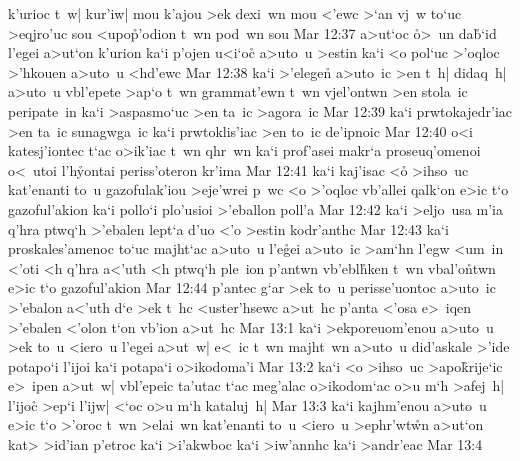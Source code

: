 k'urioc
t~w|
kur'iw|
mou
k'ajou
>ek
dexi~wn
mou
<'ewc
>`an
vj~w
to`uc
>eqjro'uc
sou
<upo\r{p}'odion
t~wn
pod~wn
sou\bibvsend
\vs Mar 12:37
a>ut`oc
\r{o}>~un
da\r{b}`id
l'egei
a>ut`on
k'urion
ka`i
p'ojen
u<i`oc\r{}
a>uto~u
>estin
ka`i
<o
pol`uc
>'oqloc
>'hkouen
a>uto~u
<hd'ewc\bibvsend
\vs Mar 12:38
ka`i
>'elegen\r{}
a>uto~ic
>en
t~h|
didaq~h|
a>uto~u
vbl'epete
>ap`o
t~wn
grammat'ewn
t~wn
vjel'ontwn
>en
stola~ic
peripate~in
ka`i
>aspasmo`uc
>en
ta~ic
>agora~ic\bibvsend
\vs Mar 12:39
ka`i
prwtokajedr'iac
>en
ta~ic
sunagwga~ic
ka`i
prwtoklis'iac
>en
to~ic
de'ipnoic\bibvsend
\vs Mar 12:40
o<i
katesj'iontec
t`ac
o>ik'iac
t~wn
qhr~wn
ka`i
prof'asei
makr`a
proseuq'omenoi
o<~utoi
l'h\r{y}ontai
periss'oteron
kr'ima\bibvsend
\vs Mar 12:41
ka`i
kaj'isac
<o\r{}
>ihso~uc
kat'enanti
to~u
gazofulak'iou
>eje'wrei
p~wc
<o
>'oqloc
vb'allei
qalk`on
e>ic
t`o
gazoful'akion
ka`i
pollo`i
plo'usioi
>'eballon
poll'a\bibvsend
\vs Mar 12:42
ka`i
>eljo~usa
m'ia
q'hra
ptwq`h
>'ebalen
lept`a
d'uo
<'o
>estin
kodr'anthc\bibvsend
\vs Mar 12:43
ka`i
proskales'amenoc
to`uc
majht`ac
a>uto~u
l'e\r{g}ei
a>uto~ic
>am`hn
l'egw
<um~in
<'oti
<h
q'hra
a<'uth
<h
ptwq`h
ple~ion
p'antwn
vb'ebl\r{h}ken
t~wn
vbal'o\r{n}twn
e>ic
t`o
gazoful'akion\bibvsend
\vs Mar 12:44
p'antec
g`ar
>ek
to~u
perisse'uontoc
a>uto~ic
>'ebalon
a<'uth
d`e
>ek
t~hc
<uster'hsewc
a>ut~hc
p'anta
<'osa
e>~iqen
>'ebalen
<'olon
t`on
vb'ion
a>ut~hc\bibvsend
\vs Mar 13:1
ka`i
>ekporeuom'enou
a>uto~u
>ek
to~u
<iero~u
l'egei
a>ut~w|
e<~ic
t~wn
majht~wn
a>uto~u
did'askale
>'ide
potapo`i
l'ijoi
ka`i
potapa`i
o>ikodoma'i\bibvsend
\vs Mar 13:2
ka`i
<o
>ihso~uc
>apo\r{k}rije`ic
e>~ipen
a>ut~w|
vbl'epeic
ta'utac
t`ac
meg'alac
o>ikodom`ac
o>u
m`h
>afej~h|
l'ijoc\r{}
>ep`i
l'ijw|
<`oc
o>u
m`h
kataluj~h|\bibvsend
\vs Mar 13:3
ka`i
kajhm'enou
a>uto~u
e>ic
t`o
>'oroc
t~wn
>elai~wn
kat'enanti
to~u
<iero~u
>ephr'wt\r{w}n
a>ut`on
kat>
>id'ian
p'etroc
ka`i
>i'akwboc
ka`i
>iw'annhc
ka`i
>andr'eac\bibvsend
\vs Mar 13:4

